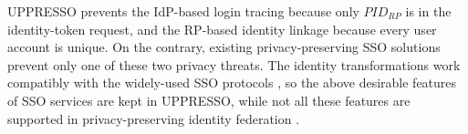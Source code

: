UPPRESSO prevents the IdP-based login tracing because only $PID_{RP}$ is in the identity-token request,
    and the RP-based identity linkage because every user account is unique.
On the contrary,
     existing privacy-preserving SSO solutions \cite{BrowserID,SPRESSO,NIST2017draft,FirefoxAccount} prevent only one of these two privacy threats.
The identity transformations work compatibly with
    the widely-used SSO protocols \cite{OpenIDConnect,rfc6749,SAML,NIST2017draft},
    so the above desirable features of SSO services are kept in UPPRESSO,
    while not all these features are supported in privacy-preserving identity federation \cite{PseudoID,ELPASSO,UnlimitID,Opaak,uprov,hyperledge-idemix}.
%
%
